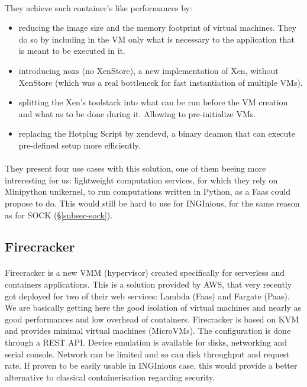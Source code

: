 \paragraph{}They achieve such container's like performances by:
\begin{itemize}
\renewcommand\labelitemi{--}
  \item reducing the image size and the memory footprint of virtual machines.  They do so by including in the VM only what is necessary to the application that is meant to be executed in it.
  \item introducing noxs (no XenStore), a new implementation of Xen, without XenStore (which was a real bottleneck for fast instantiation of multiple VMs).
  \item splitting the Xen's toolstack into what can be run before the VM creation and what as to be done during it.  Allowing to pre-initialize VMs.
  \item replacing the Hotplug Script by xendevd, a binary deamon that can execute pre-defined setup more efficiently.
\end{itemize}

\paragraph{}They present four use cases with this solution, one of them beeing more intreresting for us: lightweight computation services, for which they rely on Minipython unikernel, to run computations written in Python, as a Faas could propose to do.  This would still be hard to use for INGInious, for the same reason as for SOCK (§\ref{subsec-sock}).

\subsection{Firecracker} 
\paragraph{} Firecracker is a new VMM (hypervisor) created specifically for serverless and containers applications.  \cite{agachefirecracker}  This is a solution provided by AWS, that very recently got deployed for two of their web services: Lambda (Faas) and Fargate (Paas).  We are basically getting here the good isolation of virtual machines and nearly as good performances and low overhead of containers.  Firecracker is based on KVM and provides minimal virtual machines (MicroVMs).  The configuration is done through a REST API.  Device emulation is available for disks, networking and serial console.  Network can be limited and so can disk throughput and request rate.  If proven to be easily usable in INGInious case, this would provide a better alternative to classical containerisation regarding security.

